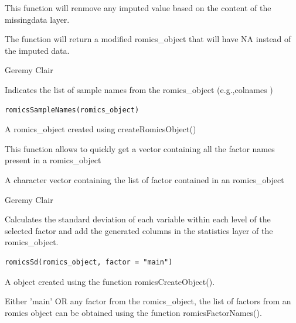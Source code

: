 \documentclass[a4paper]{book}
\begin{document}
%
\begin{Details}
This function will renmove any imputed value based on the content of the missingdata layer.
\end{Details}
%
\begin{Value}
The function will return a modified romics\_object that will have NA instead of the imputed data.
\end{Value}
%
\begin{Author}
Geremy Clair
\end{Author}
%
\begin{Description}
Indicates the list of sample names from the romics\_object (e.g.,colnames )
\end{Description}
%
\begin{Usage}
\begin{verbatim}
romicsSampleNames(romics_object)
\end{verbatim}
\end{Usage}
%
\begin{Arguments}
\begin{ldescription}
\item[\code{romics\_object}] A romics\_object created using createRomicsObject()
\end{ldescription}
\end{Arguments}
%
\begin{Details}
This function allows to quickly get a vector containing all the factor names present in a romics\_object
\end{Details}
%
\begin{Value}
A character vector containing the list of factor contained in an romics\_object
\end{Value}
%
\begin{Author}
Geremy Clair
\end{Author}
%
\begin{Description}
Calculates the standard deviation of each variable within each level of the selected factor and add the generated columns in the statistics layer of the romics\_object.
\end{Description}
%
\begin{Usage}
\begin{verbatim}
romicsSd(romics_object, factor = "main")
\end{verbatim}
\end{Usage}
%
\begin{Arguments}
\begin{ldescription}
\item[\code{romics\_object}] A object created using the function romicsCreateObject().

\item[\code{main\_factor}] Either 'main' OR any factor from the romics\_object, the list of factors from an romics object can be obtained using the function romicsFactorNames().
\end{ldescription}
\end{Arguments}
\end{document}
